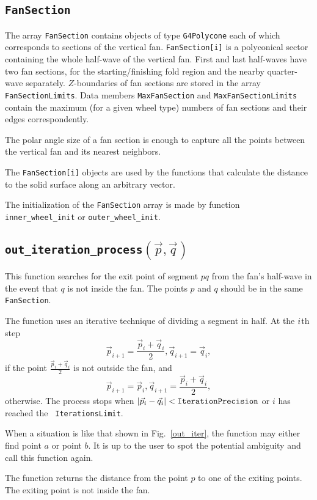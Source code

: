 \documentclass{article}
\begin{document}
\subsection{\tt FanSection}\label{fan_sect}
The array {\tt FanSection} contains objects of type {\tt G4Polycone} each of
which corresponds to sections of the vertical fan.
{\tt FanSection[i]} is a polyconical sector containing the whole 
half-wave of the vertical fan. First and last half-waves have two fan sections,
for the starting/finishing fold region and the nearby quarter-wave separately.
$Z$-boundaries of fan sections 
are stored in the array {\tt FanSectionLimits}. Data members
{\tt MaxFanSection} and {\tt MaxFanSectionLimits} contain the maximum (for a given
wheel type) numbers of fan sections and their edges correspondently.

The polar angle size of a fan section is enough to capture all the points 
between the vertical fan and its nearest neighbors.

The {\tt FanSection[i]} objects are used by the functions that calculate the
distance to the solid surface along an arbitrary vector.

The initialization of the {\tt FanSection} array is made by function \\
{\tt inner\_wheel\_init} or {\tt outer\_wheel\_init}.

\subsection{\tt out\_iteration\_process$(\vec{p}, \vec{q})$}
This function searches for the exit point of segment $pq$ from the fan's
half-wave in the event that $q$ is not inside the fan. The points $p$ and $q$
should be in the same {\tt FanSection}.

The function uses an iterative technique of dividing a segment in half.
At the $i\/$th step 
\[\vec{p}_{i+1} = \frac{\vec{p}_i+\vec{q}_i}{2}, \vec{q}_{i+1} = \vec{q}_i,\]
if the point $\frac{\vec{p}_i+\vec{q}_i}{2}$ is not outside the fan, and
\[\vec{p}_{i+1} = \vec{p}_i,  \vec{q}_{i+1} = \frac{\vec{p}_i+\vec{q}_i}{2},\]
otherwise. The process stops when
$|\vec{p}_i-\vec{q}_i|<{\tt IterationPrecision\/}\/$ or $i$ has reached the {\tt
IterationsLimit}.


When a situation is like that shown in Fig.~\ref{out_iter}, 
the function may either find point $a$ or point $b$. It is up to the user to
spot the potential ambiguity and call this function again.

The function returns the distance from the point $p$ to one of the exiting
points. The exiting point is not inside the fan.
 
\end{document}
